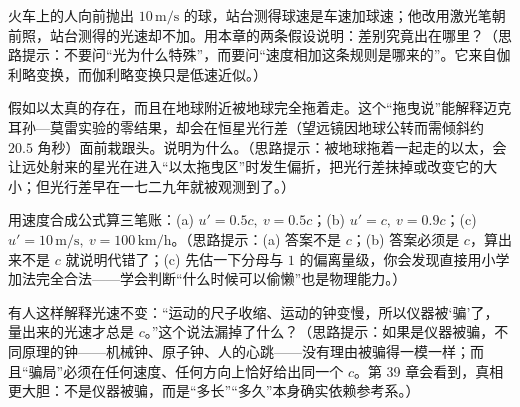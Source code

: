 \begin{puzzles}
\item 火车上的人向前抛出 \(10\,\mathrm{m/s}\) 的球，站台测得球速是车速加球速；他改用激光笔朝前照，站台测得的光速却不加。用本章的两条假设说明：差别究竟出在哪里？（思路提示：不要问“光为什么特殊”，而要问“速度相加这条规则是哪来的”。它来自伽利略变换，而伽利略变换只是低速近似。）
\item 假如以太真的存在，而且在地球附近被地球完全拖着走。这个“拖曳说”能解释迈克耳孙—莫雷实验的零结果，却会在恒星光行差（望远镜因地球公转而需倾斜约 \(20.5\) 角秒）面前栽跟头。说明为什么。（思路提示：被地球拖着一起走的以太，会让远处射来的星光在进入“以太拖曳区”时发生偏折，把光行差抹掉或改变它的大小；但光行差早在一七二九年就被观测到了。）
\item 用速度合成公式算三笔账：(a) \(u'=0.5c,\ v=0.5c\)；(b) \(u'=c,\ v=0.9c\)；(c) \(u'=10\,\mathrm{m/s},\ v=100\,\mathrm{km/h}\)。（思路提示：(a) 答案不是 \(c\)；(b) 答案必须是 \(c\)，算出来不是 \(c\) 就说明代错了；(c) 先估一下分母与 \(1\) 的偏离量级，你会发现直接用小学加法完全合法——学会判断“什么时候可以偷懒”也是物理能力。）
\item 有人这样解释光速不变：“运动的尺子收缩、运动的钟变慢，所以仪器被‘骗’了，量出来的光速才总是 \(c\)。”这个说法漏掉了什么？（思路提示：如果是仪器被骗，不同原理的钟——机械钟、原子钟、人的心跳——没有理由被骗得一模一样；而且“骗局”必须在任何速度、任何方向上恰好给出同一个 \(c\)。第 39 章会看到，真相更大胆：不是仪器被骗，而是“多长”“多久”本身确实依赖参考系。）
\end{puzzles}
